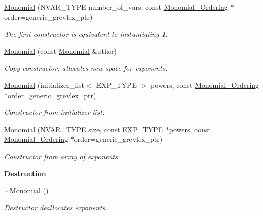 \begin{Indent}
\begin{DoxyCompactItemize}
\mbox{\label{group__polygroup_a3c710f9d6f7c7e0addc2779a037042dd}} 
\hyperlink{group__polygroup_a3c710f9d6f7c7e0addc2779a037042dd}{Monomial} (N\+V\+A\+R\+\_\+\+T\+Y\+PE number\+\_\+of\+\_\+vars, const \hyperlink{group__orderinggroup_class_monomial___ordering}{Monomial\+\_\+\+Ordering} $\ast$order=generic\+\_\+grevlex\+\_\+ptr)
\begin{DoxyCompactList}\small\item\em The first constructor is equivalent to instantiating 1. \end{DoxyCompactList}\item 
\mbox{\label{group__polygroup_ad6968b542cf22f8bc24053fb48782dcc}} 
\hyperlink{group__polygroup_ad6968b542cf22f8bc24053fb48782dcc}{Monomial} (const \hyperlink{group__polygroup_class_monomial}{Monomial} \&other)
\begin{DoxyCompactList}\small\item\em Copy constructor, allocates new space for exponents. \end{DoxyCompactList}\item 
\hyperlink{group__polygroup_a8b9c7bc9d5b286adb11ccc39471b00c4}{Monomial} (initializer\+\_\+list$<$ E\+X\+P\+\_\+\+T\+Y\+PE $>$ powers, const \hyperlink{group__orderinggroup_class_monomial___ordering}{Monomial\+\_\+\+Ordering} $\ast$order=generic\+\_\+grevlex\+\_\+ptr)
\begin{DoxyCompactList}\small\item\em Constructor from initializer list. \end{DoxyCompactList}\item 
\hyperlink{group__polygroup_a85d91b1a13592c849394c26c5ad294d8}{Monomial} (N\+V\+A\+R\+\_\+\+T\+Y\+PE size, const E\+X\+P\+\_\+\+T\+Y\+PE $\ast$powers, const \hyperlink{group__orderinggroup_class_monomial___ordering}{Monomial\+\_\+\+Ordering} $\ast$order=generic\+\_\+grevlex\+\_\+ptr)
\begin{DoxyCompactList}\small\item\em Constructor from array of exponents. \end{DoxyCompactList}\end{DoxyCompactItemize}
\end{Indent}
\begin{Indent}\textbf{ Destruction}\par
\begin{DoxyCompactItemize}
\item 
\mbox{\label{group__polygroup_a7c56cfe0292638732d60169d960f877c}} 
\hyperlink{group__polygroup_a7c56cfe0292638732d60169d960f877c}{$\sim$\+Monomial} ()
\begin{DoxyCompactList}\small\item\em Destructor deallocates exponents. \end{DoxyCompactList}\end{DoxyCompactItemize}
\end{Indent}
